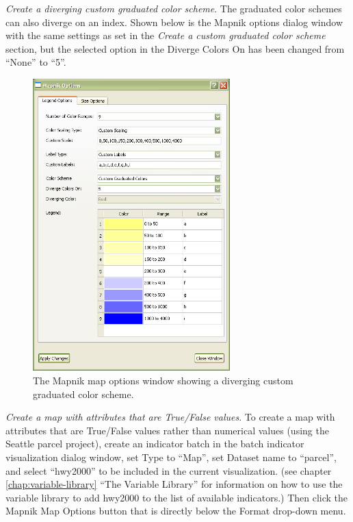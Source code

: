 \emph{Create a diverging custom graduated color scheme}. 
The graduated color 
schemes can also diverge on an index. Shown below is the Mapnik options 
dialog window with the same settings as set in the 
\emph{Create a custom graduated color scheme} section, 
but the selected option in the Diverge Colors On has been changed 
from ``None'' to ``5''.

\begin{figure}[hb]
\begin{center}
\includegraphics[width=3in]{part-gui/images/result-manager-mapnik-options-example-3.png}
\end{center}
\caption{The Mapnik map options window showing a diverging custom graduated color scheme.}
\label{fig:result-manager-mapnik-options-example-3}
\end{figure}
\clearpage

\emph{Create a map with attributes that are True/False values}.
To create a map with attributes that are True/False values rather than numerical 
values (using the Seattle parcel project), create an indicator batch in the batch 
indicator visualization dialog window, set Type to ``Map'', set Dataset name to ``parcel'', 
and select ``hwy2000'' to be included in the current visualization. (see 
chapter \ref{chap:variable-library} ``The Variable Library'' for information on how to use 
the variable library to add hwy2000 to the list of available indicators.) Then click 
the Mapnik Map Options button that is directly below the Format drop-down menu.

